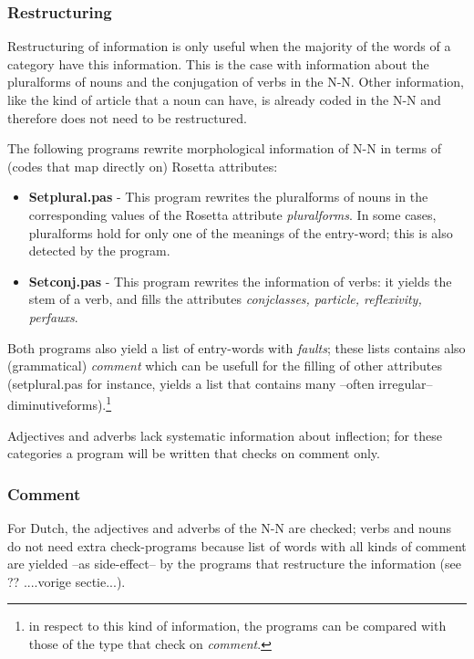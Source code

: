 \subsubsection{Restructuring}

Restructuring of information is only useful when the majority of the words
of a category have this information. This is the case with information
about the pluralforms of nouns and the conjugation of verbs in the N-N.
Other information, like the kind of article that a noun can have, is already
coded in the N-N and therefore does not need to be restructured.

The following programs rewrite morphological information of N-N
in terms of (codes that map directly on) Rosetta attributes:

\begin{itemize}
  \item {\bf Setplural.pas} - This program rewrites the pluralforms of 
        nouns 
        in the corresponding values of the Rosetta attribute {\em pluralforms}.
        In some cases, pluralforms
        hold for only one of the meanings of the entry-word; this is also 
        detected by the program. 
  \item {\bf Setconj.pas} - This program rewrites the information of verbs: it 
        yields the stem of a verb, and fills the attributes {\em conjclasses, 
        particle, reflexivity, perfauxs}. 
\end{itemize}

Both programs also yield a list of entry-words with {\em faults};
these lists contains also (grammatical) {\em comment}
which can be usefull for the filling of other attributes (setplural.pas
for instance, yields a list that contains many --often irregular--
diminutiveforms).\footnote{in respect to 
this kind of information, the programs can be compared with those of the 
type that check on {\em comment}.}

Adjectives and adverbs lack systematic information about inflection; for these 
categories a program will be written that checks on comment only.

\subsubsection{Comment}

For Dutch, the adjectives and adverbs of the N-N are checked; verbs and 
nouns do not need extra check-programs because list of words with all kinds of 
comment are yielded --as side-effect-- by the programs that restructure the 
information (see ?? ....vorige sectie...).

